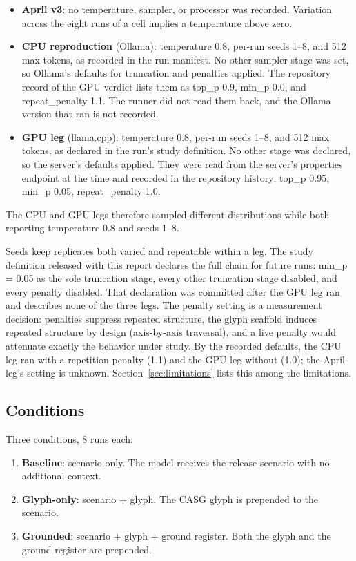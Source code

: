 \documentclass[11pt,a4paper]{article}
\begin{document}
\begin{itemize}
  \item \textbf{April v3}: no temperature, sampler, or processor was recorded.
    Variation across the eight runs of a cell implies a temperature above
    zero.
    \item \textbf{CPU reproduction} (Ollama): temperature 0.8, per-run seeds
    1--8, and 512 max tokens, as recorded in the run manifest. No other
    sampler stage was set, so Ollama's defaults for truncation and penalties
    applied. The repository record of the GPU verdict lists them as top\_p 0.9,
    min\_p 0.0, and repeat\_penalty 1.1. The runner did not read them back,
    and the Ollama version that ran is not recorded.
  \item \textbf{GPU leg} (llama.cpp): temperature 0.8, per-run seeds 1--8,
    and 512 max tokens, as declared in the run's study definition. No other
    stage was declared, so the server's defaults applied. They were read
    from the server's properties endpoint at the time and recorded in the
    repository history: top\_p 0.95, min\_p 0.05, repeat\_penalty 1.0.
\end{itemize}

The CPU and GPU legs therefore sampled different distributions while both
reporting temperature 0.8 and seeds 1--8.

Seeds keep replicates both varied and repeatable within a leg. The study
definition released with this report declares the full chain for future
runs: min\_p = 0.05 as the sole truncation stage, every other truncation
stage disabled, and every penalty disabled. That declaration was committed
after the GPU leg ran and describes none of the three legs. The penalty
setting is a measurement decision: penalties suppress repeated structure,
the glyph scaffold induces repeated structure by design (axis-by-axis
traversal), and a live penalty would attenuate exactly the behavior under
study. By the recorded
defaults, the CPU leg ran with a repetition penalty (1.1) and the GPU leg
without (1.0); the April leg's setting is unknown. Section~\ref{sec:limitations}
lists this among the limitations.

\subsection{Conditions}

Three conditions, 8 runs each:

\begin{enumerate}
  \item \textbf{Baseline}: scenario only. The model receives the release
    scenario with no additional context.
  \item \textbf{Glyph-only}: scenario + glyph. The CASG glyph is prepended to
    the scenario.
  \item \textbf{Grounded}: scenario + glyph + ground register. Both the glyph
    and the ground register are prepended.
\end{enumerate}
\end{document}
